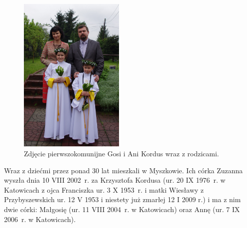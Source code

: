 \begin{figure}[!h]
\begin{center}
\includegraphics[width=0.45\textwidth, angle=90]{zdjecia/komunia_gosi_i_ani_kordus.jpg}
\caption[Pierwsza komunia św. Gosi i Ani Kordus]{Zdjęcie pierwszokomunijne Gosi i Ani Kordus wraz z rodzicami.}
\label{rys:komunia_gosi_i_ani_kordus}
\end{center}
\end{figure}

Wraz z dziećmi przez ponad 30 lat mieszkali w Myszkowie. Ich córka Zuzanna wyszła dnia 10 VIII 2002~r. za Krzysztofa Kordusa (ur. 20 IX 1976~r. w Katowicach z ojca Franciszka ur. 3 X 1953~r. i matki Wiesławy z Przybyszewskich ur. 12 V 1953 i niestety już zmarłej 12 I 2009 r.) i ma z nim dwie córki: Małgosię (ur. 11 VIII 2004~r. w Katowicach) oraz Annę (ur. 7 IX 2006~r. w Katowicach).

